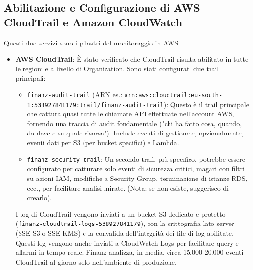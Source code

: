 \subsection{Abilitazione e Configurazione di AWS CloudTrail e Amazon CloudWatch}
\label{subsec:cloudtrail-cloudwatch-enable_cap2}
Questi due servizi sono i pilastri del monitoraggio in AWS.
\begin{itemize}
    \item \textbf{AWS CloudTrail}: È stato verificato che CloudTrail risulta abilitato in tutte le regioni e a livello di Organization.  Sono stati configurati due trail principali:
    \begin{itemize}
        \item \texttt{finanz-audit-trail} (ARN es.: \texttt{arn:aws:cloudtrail:eu-south-1:538927841179:trail/finanz-audit-trail}): Questo è il trail principale che cattura quasi tutte le chiamate API effettuate nell'account AWS, fornendo una traccia di audit fondamentale ("chi ha fatto cosa, quando, da dove e su quale risorsa"). Include eventi di gestione e, opzionalmente, eventi dati per S3 (per bucket specifici) e Lambda.
        \item \texttt{finanz-security-trail}: Un secondo trail, più specifico, potrebbe essere configurato per catturare solo eventi di sicurezza critici, magari con filtri su azioni IAM, modifiche a Security Group, terminazione di istanze RDS, ecc., per facilitare analisi mirate. (Nota: se non esiste, suggerisco di crearlo).
    \end{itemize}
    I log di CloudTrail vengono inviati a un bucket S3 dedicato e protetto (\texttt{finanz-cloudtrail-logs-538927841179}), con la crittografia lato server (SSE-S3 o SSE-KMS) e la convalida dell'integrità dei file di log abilitate. Questi log vengono anche inviati a CloudWatch Logs per facilitare query e allarmi in tempo reale. Finanz analizza, in media, circa 15.000-20.000 eventi CloudTrail al giorno solo nell'ambiente di produzione.


\end{itemize}
